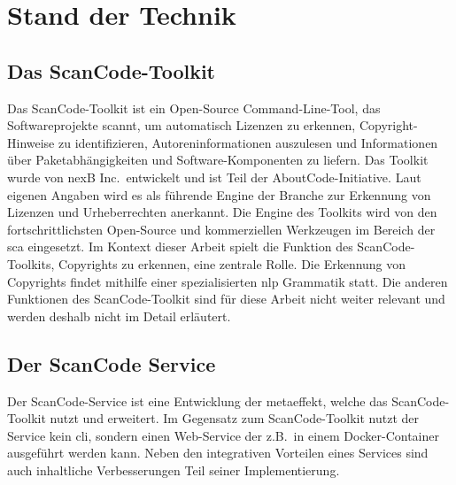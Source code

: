 \chapter{Stand der Technik}\label{ch:stand-der-technik}


\section{Das ScanCode-Toolkit}\label{sec:scancode-toolkit}

Das ScanCode-Toolkit ist ein Open-Source Command-Line-Tool, das Softwareprojekte scannt, um automatisch Lizenzen zu erkennen, Copyright-Hinweise zu identifizieren, Autoreninformationen auszulesen und Informationen über Paketabhängigkeiten und Software-Komponenten zu liefern.
Das Toolkit wurde von nexB Inc.\ entwickelt und ist Teil der AboutCode-Initiative.
Laut eigenen Angaben wird es als führende Engine der Branche zur Erkennung von Lizenzen und Urheberrechten anerkannt.
Die Engine des Toolkits wird von den fortschrittlichsten Open-Source und kommerziellen Werkzeugen im Bereich der \gls{sca} eingesetzt.
Im Kontext dieser Arbeit spielt die Funktion des ScanCode-Toolkits, Copyrights zu erkennen, eine zentrale Rolle.
Die Erkennung von Copyrights findet mithilfe einer spezialisierten \gls{nlp} Grammatik statt.
Die anderen Funktionen des ScanCode-Toolkit sind für diese Arbeit nicht weiter relevant und werden deshalb nicht im Detail erläutert\autocite{noauthor_scancode-toolkit-documentation_nodate}.



\section{Der ScanCode Service}\label{sec:scancode-service}

Der ScanCode-Service ist eine Entwicklung der metaeffekt, welche das ScanCode-Toolkit nutzt und erweitert.
Im Gegensatz zum ScanCode-Toolkit nutzt der Service kein \gls{cli}, sondern einen Web-Service der z.B.\ in einem Docker-Container ausgeführt werden kann.
Neben den integrativen Vorteilen eines Services sind auch inhaltliche Verbesserungen Teil seiner Implementierung.

